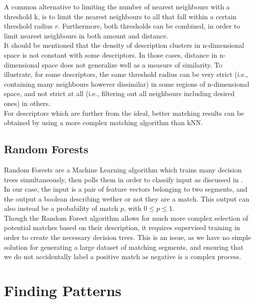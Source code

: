 A common alternative to limiting the number of nearest neighbours with a threshold k, is to limit the nearest neighbours to all that fall within a certain threshold radius $r$. Furthermore, both thresholds can be combined, in order to limit nearest neighbours in both amount and distance.\\

It should be mentioned that the density of description clusters in n-dimensional space is not constant with some descriptors. In those cases, distance in n-dimensional space does not generalize well as a measure of similarity. To illustrate, for some descriptors, the same threshold radius can be very strict (i.e., containing many neighbours however dissimilar) in some regions of n-dimensional space, and not strict at all (i.e., filtering out all neighbours including desired ones) in others.\\

For descriptors which are further from the ideal, better matching results can be obtained by using a more complex matching algorithm than kNN.

\subsection{Random Forests}
\label{subsec:RF}

Random Forests are a Machine Learning algorithm which trains many decision trees simultaneously, then polls them in order to classify input as discussed in \cite{breiman2001random}.\\

In our case, the input is a pair of feature vectors belonging to two segments, and the output a boolean describing wether or not they are a match. This output can also instead be a probability of match $p$, with $0 \leq p \leq 1$.\\

Though the Random Forest algorithm allows for much more complex selection of potential matches based on their description, it requires supervised training in order to create the necessary decision trees. This is an issue, as we have no simple solution for generating a large dataset of matching segments, and ensuring that we do not accidentally label a positive match as negative is a complex process.\\


\section{Finding Patterns}
\label{sec:filtering}

